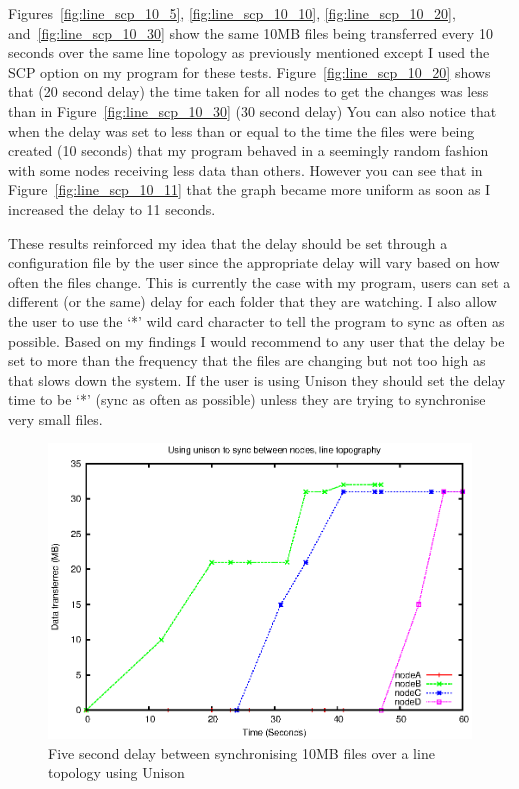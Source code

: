 \documentclass[12pt]{article}
\begin{document}
Figures~\ref{fig:line_scp_10_5},
\ref{fig:line_scp_10_10}, \ref{fig:line_scp_10_20},
and~\ref{fig:line_scp_10_30} show the same 10MB files
being transferred every 10 seconds over the same line topology
as previously
mentioned except I used the SCP option on my program for
these tests.
Figure~\ref{fig:line_scp_10_20} shows that
(20 second delay) the time taken for all nodes to get
the changes was less than
in Figure~\ref{fig:line_scp_10_30} (30 second delay)
You can also notice that when the delay was
set to less than or equal to the time the files were
being created (10 seconds) that my program behaved 
in a seemingly random fashion with some nodes receiving less data
than others. However you can see that in Figure~\ref{fig:line_scp_10_11}
that the graph became more uniform as
soon as I increased the delay to 11 seconds.

These results reinforced my idea that the delay should
be set through a configuration file by the user since
the appropriate delay will vary based on how often
the files change. This is currently the case with my
program, users can set a different (or the same)
delay for each folder that they are watching. I
also allow the user to use the `*' wild card character
to tell the program to sync as often as possible. Based
on my findings I would recommend to any user that
the delay be set to more than the frequency that the files
are changing but not too high as that slows down
the system. If the user is using Unison they should
set the delay time to be `*' (sync as often as possible)
unless they are trying to synchronise very small files.

\newpage
\begin{figure}[ht!]
\centering
\includegraphics[height=0.4\textheight]{images/line-uni-10-5.eps}
\caption{Five second delay between synchronising 10MB files over a line topology
using Unison}
\label{fig:line_uni_10_5}
\end{figure}
\end{document}
